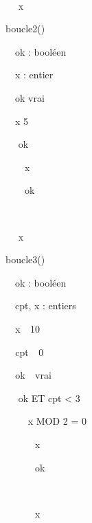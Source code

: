{\sffamily
\ \ }

{\sffamily
\ \  x}

{\sffamily
{} }


\bigskip

{\sffamily
{} boucle2()}

{\sffamily
\ \ ok : booléen}

{\sffamily
\ \ x : entier}

{\sffamily
\ \ ok  vrai}

{\sffamily
\ \ x  5}

{\sffamily
\ \  ok }

{\sffamily
{\ \ \ \ x
}}

{\sffamily
{\ \ \ \ ok
}}

{\sffamily
\ \ }

{\sffamily
\ \  x}

{\sffamily
{} }


\bigskip

{\sffamily
{} boucle3()}

{\sffamily
\ \ ok : booléen}

{\sffamily
\ \ cpt, x : entiers}

{\sffamily
\texttt{\ \ }x\texttt{
}\texttt{ }10}

{\sffamily
\texttt{\ \ }cpt\texttt{
}\texttt{ }0}

{\sffamily
\texttt{\ \ }ok\texttt{
}\texttt{ }vrai}

{\sffamily
\ \  ok ET cpt {\textless} 3
}

{\sffamily
\ \ \ \  x MOD 2 = 0 }

{\sffamily
{\texttt{\ \ \ \ \ \ }}{x}{\texttt{
}}}

{\sffamily
{\texttt{\ \ \ \ \ \ }}{ok}{\texttt{
}}}

{\sffamily
\ \ \ \ }

{\sffamily
{\texttt{\ \ \ \ \ \ }}{x}{\texttt{
}}}

